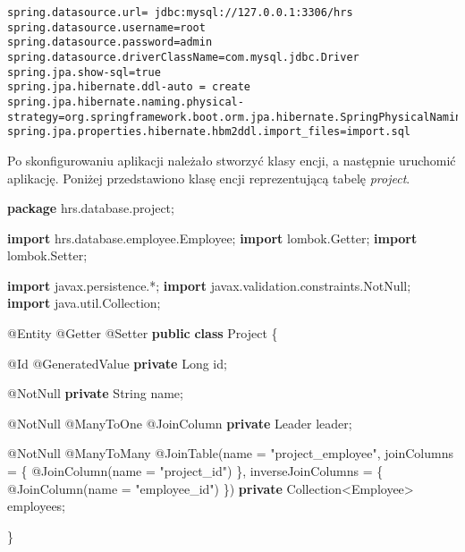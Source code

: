 \documentclass[]{article}
\newenvironment{Shaded}{}{}
\newcommand{\AttributeTok}[1]{\textcolor[rgb]{0.49,0.56,0.16}{#1}}
\newcommand{\BuiltInTok}[1]{#1}
\newcommand{\ImportTok}[1]{#1}
\newcommand{\KeywordTok}[1]{\textcolor[rgb]{0.00,0.44,0.13}{\textbf{#1}}}
\newcommand{\NormalTok}[1]{#1}
\newcommand{\StringTok}[1]{\textcolor[rgb]{0.25,0.44,0.63}{#1}}
\begin{document}
\begin{verbatim}
spring.datasource.url= jdbc:mysql://127.0.0.1:3306/hrs
spring.datasource.username=root
spring.datasource.password=admin
spring.datasource.driverClassName=com.mysql.jdbc.Driver
spring.jpa.show-sql=true
spring.jpa.hibernate.ddl-auto = create
spring.jpa.hibernate.naming.physical-strategy=org.springframework.boot.orm.jpa.hibernate.SpringPhysicalNamingStrategy
spring.jpa.properties.hibernate.hbm2ddl.import_files=import.sql
\end{verbatim}

Po skonfigurowaniu aplikacji należało stworzyć klasy encji, a następnie
uruchomić aplikację. Poniżej przedstawiono klasę encji reprezentującą
tabelę \emph{project}.

\begin{Shaded}
\begin{Highlighting}[]
\KeywordTok{package}\ImportTok{ hrs.database.project;}

\KeywordTok{import}\ImportTok{ hrs.database.employee.Employee;}
\KeywordTok{import}\ImportTok{ lombok.Getter;}
\KeywordTok{import}\ImportTok{ lombok.Setter;}

\KeywordTok{import}\ImportTok{ javax.persistence.*;}
\KeywordTok{import}\ImportTok{ javax.validation.constraints.NotNull;}
\KeywordTok{import}\ImportTok{ java.util.Collection;}

\AttributeTok{@Entity}
\AttributeTok{@Getter}
\AttributeTok{@Setter}
\KeywordTok{public} \KeywordTok{class}\NormalTok{ Project \{}

    \AttributeTok{@Id}
    \AttributeTok{@GeneratedValue}
    \KeywordTok{private} \BuiltInTok{Long}\NormalTok{ id;}

    \AttributeTok{@NotNull}
    \KeywordTok{private} \BuiltInTok{String}\NormalTok{ name;}

    \AttributeTok{@NotNull}
    \AttributeTok{@ManyToOne}
    \AttributeTok{@JoinColumn}
    \KeywordTok{private}\NormalTok{ Leader leader;}

    \AttributeTok{@NotNull}
    \AttributeTok{@ManyToMany}
    \AttributeTok{@JoinTable}\NormalTok{(name = }\StringTok{"project_employee"}\NormalTok{, joinColumns = \{}
            \AttributeTok{@JoinColumn}\NormalTok{(name = }\StringTok{"project_id"}\NormalTok{)}
\NormalTok{    \}, inverseJoinColumns = \{}
            \AttributeTok{@JoinColumn}\NormalTok{(name = }\StringTok{"employee_id"}\NormalTok{)}
\NormalTok{    \})}
    \KeywordTok{private} \BuiltInTok{Collection}\NormalTok{<Employee> employees;}

\NormalTok{\}}
\end{Highlighting}
\end{Shaded}
\end{document}
